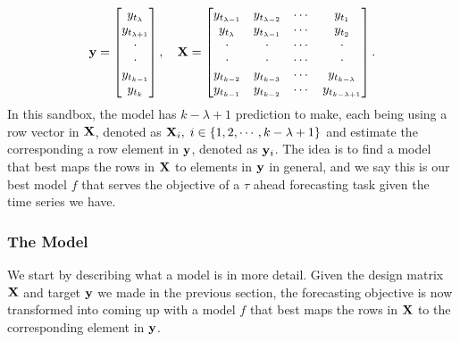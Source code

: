\begin{equation*}
    \mathbf{y} = \begin{bmatrix}
        y_{t_\lambda}       \\
        y_{t_{\lambda + 1}} \\
        \cdot               \\
        \cdot               \\
        y_{t_{k-1}}         \\
        y_{t_k}             \\
    \end{bmatrix}
    , \quad
    \mathbf{X} = \begin{bmatrix}
        y_{t_{\lambda - 1}}   & y_{t_{\lambda - 2}} & \cdots & y_{t_{1}} \\
        y_{t_\lambda}         & y_{t_{\lambda - 1}} & \cdots & y_{t_{2}} \\
        \cdot                 & \cdot               & \cdots & \cdot     \\
        \cdot                 & \cdot               & \cdots & \cdot     \\
        y_{t_{k - 2}}         & y_{t_{k - 3}}       & \cdots & y_{t_{k - \lambda}} \\
        y_{t_{k - 1}}         & y_{t_{k - 2}}       & \cdots & y_{t_{k - \lambda + 1}} \\
    \end{bmatrix}.
\end{equation*}
In this sandbox, the model has $k-\lambda + 1$ prediction to make, each being using a row vector in $\mathbf{X}$, denoted as $\mathbf{X}_i, \; i \in \{1, 2, \cdots, k-\lambda+1 \}$ and estimate the corresponding a row element in $\mathbf{y}$, denoted as $\mathbf{y}_i$. The idea is to find a model that best maps the rows in $\mathbf{X}$ to elements in $\mathbf{y}$ in general, and we say this is our best model $f$ that serves the objective of a $\tau$ ahead forecasting task given the time series we have.

\subsubsection{The Model}
We start by describing what a model is in more detail. Given the design matrix $\mathbf{X}$ and target $\mathbf{y}$ we made in the previous section, the forecasting objective is now transformed into coming up with a model $f$ that best maps the rows in $\mathbf{X}$ to the corresponding element in $\mathbf{y}$.

